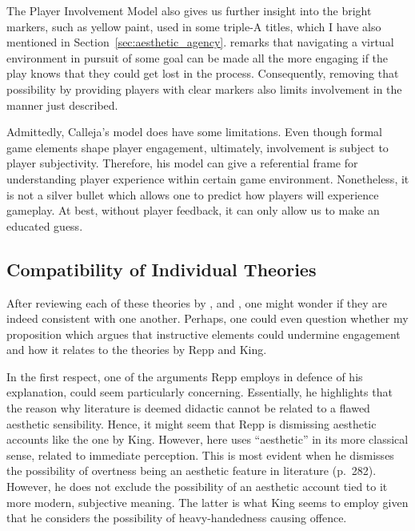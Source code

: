 The Player Involvement Model also gives us further insight into the bright markers, such as yellow paint, used in some triple-A titles, which I have also mentioned in Section~\ref{sec:aesthetic_agency}. \textcite[75-77]{calleja_in_game_2011} remarks that navigating a virtual environment in pursuit of some goal can be made all the more engaging if the play knows that they could get lost in the process. Consequently, removing that possibility by providing players with clear markers also limits involvement in the manner just described.

Admittedly, Calleja's model does have some limitations. Even though formal game elements shape player engagement, ultimately, involvement is subject to player subjectivity. Therefore, his model can give a referential frame for understanding player experience within certain game environment. Nonetheless, it is not a silver bullet which allows one to predict how players will experience gameplay. At best, without player feedback, it can only allow us to make an educated guess.

\subsection{Compatibility of Individual Theories} \label{sec:theory_compatibility}

After reviewing each of these theories by \textcite{repp_whats_2012}, \textcite{king_virtue_2017} and \textcite{calleja_in_game_2011}, one might wonder if they are indeed consistent with one another. Perhaps, one could even question whether my proposition which argues that instructive elements could undermine engagement and how it relates to the theories by Repp and King.

In the first respect, one of the arguments Repp employs in defence of his explanation, could seem particularly concerning. Essentially, he highlights that the reason why literature is deemed didactic cannot be related to a flawed aesthetic sensibility. Hence, it might seem that Repp is dismissing aesthetic accounts like the one by King. However, here \textcite{repp_whats_2012} uses ``aesthetic'' in its more classical sense, related to immediate perception. This is most evident when he dismisses the possibility of overtness being an aesthetic feature in literature (p.~282). However, he does not exclude the possibility of an aesthetic account tied to it more modern, subjective meaning. The latter is what King seems to employ given that he considers the possibility of heavy-handedness causing offence.

